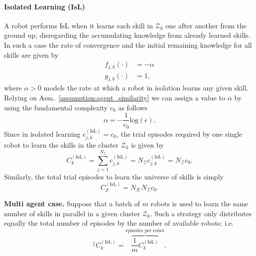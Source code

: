 \paragraph{Isolated Learning (IsL)} A robot performs IsL when it learns each skill in $\mathcal{Z}_k$ one after another from the ground up, disregarding the accumulating knowledge from already learned skills. In such a case the rate of convergence and the initial remaining knowledge for all skills are given by
\begin{subequations}\label{eq:fg_isolated}
	\begin{alignat}{2}
		f_{j,k}\left(\cdot \right) &=  -\alpha \\
		g_{j,k}\left(\cdot \right) &= 1,
	\end{alignat}
\end{subequations}
where $ \alpha>0$ models the rate at which a robot in isolation learns any given skill. Relying on Asm.~\ref{assumption:agent_similarity} we can assign a value to $\alpha$ by using the fundamental complexity $c_0$ as follows
\begin{equation}\label{eq:isolated_learning_rate}
	\alpha = -\frac{1}{c_0}\text{log}(\epsilon).
\end{equation}
Since in isolated learning $c^{(\text{IsL})}_{j,k} = c_0$, the trial episodes required by one single robot to learn the skills in the cluster $\mathcal{Z}_k$ is given by
\begin{equation}
	C^{(\text{IsL})}_{k} = \sum_{j=1}^{N_{\mathcal{Z}}} c^{(\text{IsL})}_{j,k}= N_{\mathcal{Z}}  c^{(\text{IsL})}_{j,k} = N_{\mathcal{Z}} c_0.
\end{equation}
Similarly, the total trial episodes to learn the universe of skills is simply
\begin{equation}
	C^{(\text{IsL})}_{\mathcal{S}} = N_\mathcal{K} N_{\mathcal{Z}} c_0.
\end{equation}

\textbf{Multi agent case.} Suppose that a batch of $m$ robots is used to learn the same number of skills in parallel in a given cluster $\mathcal{Z}_k$. Such a strategy only distributes equally the total number of episodes by the number of available robots; i.e.
\begin{equation}
	^{\lvert \lvert}C^{(\text{IsL})}_k=  \overbrace{\frac{1}{m}C^{(\text{IsL})}_k}^{\text{episodes per robot}}.
\end{equation}

